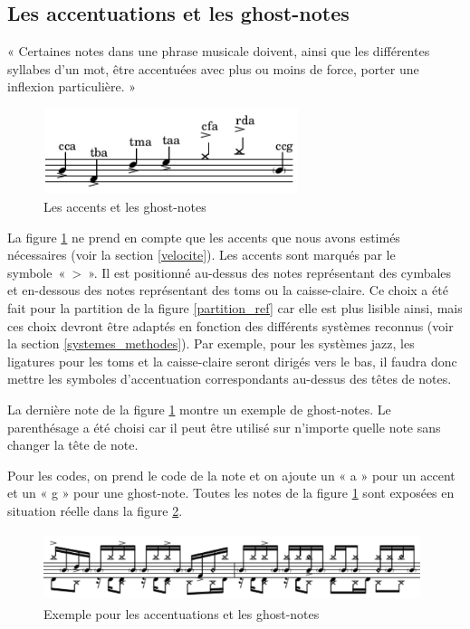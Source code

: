 \subsection*{Les accentuations et les ghost-notes}
« Certaines notes dans une phrase musicale doivent, ainsi que les différentes syllabes d’un mot, être accentuées avec plus ou moins de force, porter une inflexion particulière. » \cite{danhauser}
\begin{figure}[h]
	\centering
	\includegraphics[height=25mm, width=75mm]{z_images/3_methodes/0_notation_de_la_batterie/8_accents_et_ghost-notes_0.png}
	\caption{Les accents et les ghost-notes}
	\label{accents_et_gn}
\end{figure}

La figure \ref{accents_et_gn} ne prend en compte que les accents 
que nous avons estimés nécessaires (voir la section \ref{velocite}). 
Les accents sont marqués par le symbole~«~>~». 
Il est positionné au-dessus des notes représentant des cymbales et en-dessous des notes représentant des toms ou la caisse-claire. Ce choix a été fait pour la partition de la figure \ref{partition_ref} car elle est plus lisible ainsi, mais ces choix devront être adaptés en fonction des différents systèmes reconnus (voir la section \ref{systemes_methodes}). Par exemple, pour les systèmes jazz, les ligatures pour les toms et la caisse-claire seront dirigés vers le bas, il faudra donc mettre les symboles d’accentuation correspondants au-dessus des têtes de notes.

La dernière note de la figure \ref{accents_et_gn} montre un exemple de ghost-notes. 
Le parenthésage a été choisi car il peut être utilisé sur n’importe quelle note sans changer la tête de note.

Pour les codes, 
on prend le code de la note et on ajoute un « a » pour un accent et un « g » pour une ghost-note. Toutes les notes de la figure \ref{accents_et_gn} sont exposées en situation réelle dans la figure \ref{exemple_acc_et_gn}. 
\begin{figure}[h]
	\centering
	\includegraphics[height=20mm, width=110mm]{z_images/3_methodes/0_notation_de_la_batterie/8_accents_et_ghost-notes_1.png}
	\caption{Exemple pour les accentuations et les ghost-notes}
	\label{exemple_acc_et_gn}
\end{figure}\newpage
